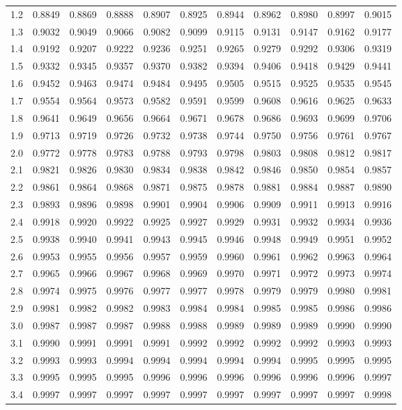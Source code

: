 \begin{center}
\begin{tabular}{c|cccccccccc}
1.2 & 0.8849 & 0.8869 & 0.8888 & 0.8907 & 0.8925 & 0.8944 & 0.8962 & 0.8980 & 0.8997 & 0.9015\\
1.3 & 0.9032 & 0.9049 & 0.9066 & 0.9082 & 0.9099 & 0.9115 & 0.9131 & 0.9147 & 0.9162 & 0.9177\\
1.4 & 0.9192 & 0.9207 & 0.9222 & 0.9236 & 0.9251 & 0.9265 & 0.9279 & 0.9292 & 0.9306 & 0.9319\\
1.5 & 0.9332 & 0.9345 & 0.9357 & 0.9370 & 0.9382 & 0.9394 & 0.9406 & 0.9418 & 0.9429 & 0.9441\\
1.6 & 0.9452 & 0.9463 & 0.9474 & 0.9484 & 0.9495 & 0.9505 & 0.9515 & 0.9525 & 0.9535 & 0.9545\\
1.7 & 0.9554 & 0.9564 & 0.9573 & 0.9582 & 0.9591 & 0.9599 & 0.9608 & 0.9616 & 0.9625 & 0.9633\\
1.8 & 0.9641 & 0.9649 & 0.9656 & 0.9664 & 0.9671 & 0.9678 & 0.9686 & 0.9693 & 0.9699 & 0.9706\\
1.9 & 0.9713 & 0.9719 & 0.9726 & 0.9732 & 0.9738 & 0.9744 & 0.9750 & 0.9756 & 0.9761 & 0.9767\\
2.0 & 0.9772 & 0.9778 & 0.9783 & 0.9788 & 0.9793 & 0.9798 & 0.9803 & 0.9808 & 0.9812 & 0.9817\\
2.1 & 0.9821 & 0.9826 & 0.9830 & 0.9834 & 0.9838 & 0.9842 & 0.9846 & 0.9850 & 0.9854 & 0.9857\\
2.2 & 0.9861 & 0.9864 & 0.9868 & 0.9871 & 0.9875 & 0.9878 & 0.9881 & 0.9884 & 0.9887 & 0.9890\\
2.3 & 0.9893 & 0.9896 & 0.9898 & 0.9901 & 0.9904 & 0.9906 & 0.9909 & 0.9911 & 0.9913 & 0.9916\\
2.4 & 0.9918 & 0.9920 & 0.9922 & 0.9925 & 0.9927 & 0.9929 & 0.9931 & 0.9932 & 0.9934 & 0.9936\\
2.5 & 0.9938 & 0.9940 & 0.9941 & 0.9943 & 0.9945 & 0.9946 & 0.9948 & 0.9949 & 0.9951 & 0.9952\\
2.6 & 0.9953 & 0.9955 & 0.9956 & 0.9957 & 0.9959 & 0.9960 & 0.9961 & 0.9962 & 0.9963 & 0.9964\\
2.7 & 0.9965 & 0.9966 & 0.9967 & 0.9968 & 0.9969 & 0.9970 & 0.9971 & 0.9972 & 0.9973 & 0.9974\\
2.8 & 0.9974 & 0.9975 & 0.9976 & 0.9977 & 0.9977 & 0.9978 & 0.9979 & 0.9979 & 0.9980 & 0.9981\\
2.9 & 0.9981 & 0.9982 & 0.9982 & 0.9983 & 0.9984 & 0.9984 & 0.9985 & 0.9985 & 0.9986 & 0.9986\\
3.0 & 0.9987 & 0.9987 & 0.9987 & 0.9988 & 0.9988 & 0.9989 & 0.9989 & 0.9989 & 0.9990 & 0.9990\\
3.1 & 0.9990 & 0.9991 & 0.9991 & 0.9991 & 0.9992 & 0.9992 & 0.9992 & 0.9992 & 0.9993 & 0.9993\\
3.2 & 0.9993 & 0.9993 & 0.9994 & 0.9994 & 0.9994 & 0.9994 & 0.9994 & 0.9995 & 0.9995 & 0.9995\\
3.3 & 0.9995 & 0.9995 & 0.9995 & 0.9996 & 0.9996 & 0.9996 & 0.9996 & 0.9996 & 0.9996 & 0.9997\\
3.4 & 0.9997 & 0.9997 & 0.9997 & 0.9997 & 0.9997 & 0.9997 & 0.9997 & 0.9997 & 0.9997 & 0.9998\\
\bottomrule\end{tabular}\end{center}
